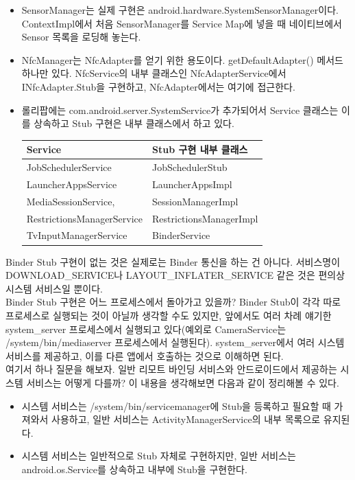 \begin{itemize}
\item SensorManager는 실제 구현은 android.hardware.SystemSensorManager이다. ContextImpl에서 처음 SensorManager를 Service Map에 넣을 때 네이티브에서 Sensor 목록을 로딩해 놓는다.
\item NfcManager는 NfcAdapter를 얻기 위한 용도이다.  getDefaultAdapter() 메서드 하나만 있다. NfcService의 내부 클래스인 NfcAdapterService에서 INfcAdapter.Stub을 구현하고, NfcAdapter에서는 여기에 접근한다.
\item 롤리팝에는 com.android.server.SystemService가 추가되어서 Service 클래스는 이를 상속하고 Stub 구현은 내부 클래스에서 하고 있다.\\
\begin{tabular}[fontsize=\tiny]{|l|l|} \hline
Service & Stub 구현 내부 클래스 \\ \hline
JobSchedulerService & JobSchedulerStub \\ \hline
LauncherAppsService & LauncherAppsImpl \\ \hline
MediaSessionService, & SessionManagerImpl \\ \hline
RestrictionsManagerService & RestrictionsManagerImpl \\ \hline
TvInputManagerService & BinderService \\ \hline
\end{tabular}
\end{itemize}

Binder Stub 구현이 없는 것은 실제로는 Binder 통신을 하는 건 아니다.
서비스명이 DOWNLOAD\_SERVICE나 LAYOUT\_INFLATER\_SERVICE 같은 것은 편의상 시스템 서비스일 뿐이다.\\

Binder Stub 구현은 어느 프로세스에서 돌아가고 있을까? Binder Stub이 각각 따로 프로세스로 실행되는 것이 아닐까 생각할 수도 있지만, 앞에서도 여러 차례 얘기한 system\_server 프로세스에서 실행되고 있다(예외로 CameraService는 /system/bin/mediaserver 프로세스에서 실행된다).			
system\_server에서 여러 시스템 서비스를 제공하고, 이를 다른 앱에서 호출하는 것으로 이해하면 된다.\\

여기서 하나 질문을 해보자. 일반 리모트 바인딩 서비스와 안드로이드에서 제공하는 시스템 서비스는 어떻게 다를까?
이 내용을 생각해보면 다음과 같이 정리해볼 수 있다.
\begin{itemize}
\item 시스템 서비스는 /system/bin/servicemanager에 Stub을 등록하고 필요할 때 가져와서 사용하고, 일반 서비스는 ActivityManagerService의 내부 목록으로 유지된다.
\item 시스템 서비스는 일반적으로 Stub 자체로 구현하지만, 일반 서비스는 android.os.Service를 상속하고 내부에 Stub을 구현한다.
\end{itemize}

